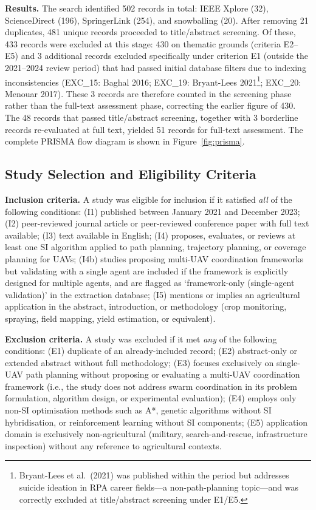 \documentclass[review,3p,times]{elsarticle}
\begin{document}
\textbf{Results.} The search identified 502 records in total: IEEE Xplore (32), ScienceDirect (196), SpringerLink (254), and snowballing (20). After removing 21 duplicates, 481 unique records proceeded to title/abstract screening. Of these, 433 records were excluded at this stage: 430 on thematic grounds (criteria E2--E5) and 3 additional records excluded specifically under criterion E1 (outside the 2021--2024 review period) that had passed initial database filters due to indexing inconsistencies (EXC\_15: Baghal 2016; EXC\_19: Bryant-Lees 2021\footnote{Bryant-Lees et al.\ (2021) was published within the period but addresses suicide ideation in RPA career fields---a non-path-planning topic---and was correctly excluded at title/abstract screening under E1/E5.}; EXC\_20: Menouar 2017). These 3 records are therefore counted in the screening phase rather than the full-text assessment phase, correcting the earlier figure of 430. The 48 records that passed title/abstract screening, together with 3 borderline records re-evaluated at full text, yielded 51 records for full-text assessment. The complete PRISMA flow diagram is shown in Figure~\ref{fig:prisma}.

\subsection{Study Selection and Eligibility Criteria}

\textbf{Inclusion criteria.} A study was eligible for inclusion if it satisfied \textit{all} of the following conditions: (I1) published between January 2021 and December 2023; (I2) peer-reviewed journal article or peer-reviewed conference paper with full text available; (I3) text available in English; (I4) proposes, evaluates, or reviews at least one SI algorithm applied to path planning, trajectory planning, or coverage planning for UAVs; (I4b) studies proposing multi-UAV coordination frameworks but validating with a single agent are included if the framework is explicitly designed for multiple agents, and are flagged as `framework-only (single-agent validation)' in the extraction database; (I5) mentions or implies an agricultural application in the abstract, introduction, or methodology (crop monitoring, spraying, field mapping, yield estimation, or equivalent).

\textbf{Exclusion criteria.} A study was excluded if it met \textit{any} of the following conditions: (E1) duplicate of an already-included record; (E2) abstract-only or extended abstract without full methodology; (E3) focuses exclusively on single-UAV path planning without proposing or evaluating a multi-UAV coordination framework (i.e., the study does not address swarm coordination in its problem formulation, algorithm design, or experimental evaluation); (E4) employs only non-SI optimisation methods such as A*, genetic algorithms without SI hybridisation, or reinforcement learning without SI components; (E5) application domain is exclusively non-agricultural (military, search-and-rescue, infrastructure inspection) without any reference to agricultural contexts.
\end{document}
